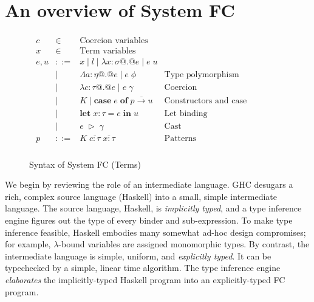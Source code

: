 \documentclass[a4paper,UKenglish]{lipics}
\newcommand{\psim}{\mathrel{\sim_{\tiny \#}}}
\newcommand{\ol}[1]{\overline{#1}}
\newcommand{\tcase}[2]{\mathbf{case}\;#1\;\mathbf{of}\;\ol{#2}}
\newcommand{\tlet}[4]{\mathbf{let}\;#1{:}#2 = #3\;\mathbf{in}\;#4}
\newcommand{\tcast}[2]{#1\;\triangleright\;#2}
\begin{document}

\section{An overview of System FC} \label{s:intro-coercions}

\begin{figure}\small
\[\begin{array}{l} 
\begin{array}{lrll}
c   &  \in & \text{Coercion variables} \\ 
x   & \in  & \text{Term variables} \\ 
e,u & ::= & x \mid l \mid \lambda x{:}\sigma @.@ e \mid e\;u \\ 
    & \mid    & \Lambda a{:}\eta @.@ e \mid e\;\phi   & \text{Type polymorphism} \\
    & \mid    & \lambda c{:}\tau @.@ e \mid e\;\gamma & \text{Coercion abstraction/application} \\
    & \mid    & K \mid \tcase{e}{p \to u} & \text{Constructors and case expressions} \\ 
    & \mid    & \tlet{x}{\tau}{e}{u} & \text{Let binding}    \\ 
    & \mid    & \tcast{e}{\gamma}         &   \text{Cast} \\
p   & ::=     & K\;\ol{c{:}\tau}\;\ol{x{:}\tau} & \text{Patterns} \\[3mm]
\end{array}
\end{array}\] 
\caption{Syntax of System FC (Terms)}\label{fig:syntax1}
\end{figure}


We begin by reviewing the role of an intermediate
language.  GHC desugars a rich, complex source language (Haskell) into
a small, simple intermediate language.  The source language, Haskell, is \emph{implicitly typed},
and a type inference engine figures out the type of every binder and sub-expression.
To make type inference feasible, Haskell embodies many somewhat ad-hoc design
compromises; for example, $\lambda$-bound variables are assigned monomorphic types.
By contrast, the intermediate language is simple, uniform, and \emph{explicitly typed}.
It can be typechecked by a simple, linear time algorithm.  The type inference
engine \emph{elaborates} the implicitly-typed Haskell program into an
explicitly-typed FC program.
\end{document}
